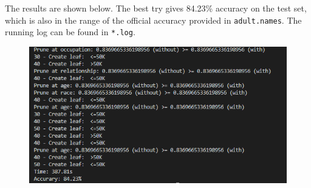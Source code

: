 \documentclass[a4paper, 11pt]{article}
\begin{document}
% 

The results are shown below.
The best try gives 84.23\% accuracy on the test set, which is also in the range of the official accuracy provided in \verb'adult.names'.
The running log can be found in \verb'*.log'.

\begin{figure}[H]
\centering
\includegraphics[width=0.8\linewidth]{fig/result-no-fnlwgt-d5-no-shuffle.png}
\end{figure}
\end{document}
